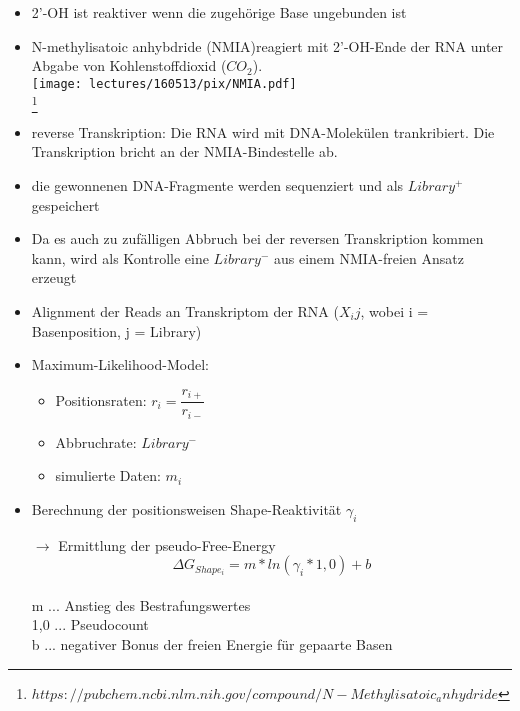 \begin{itemize}
\item 2'-OH ist reaktiver wenn die zugehörige Base ungebunden ist
\item N-methylisatoic anhybdride (NMIA)reagiert mit 2'-OH-Ende der RNA unter Abgabe von Kohlenstoffdioxid ($CO_2$). \\
\texttt{[image: lectures/160513/pix/NMIA.pdf]} \\
\footnote{$https://pubchem.ncbi.nlm.nih.gov/compound/N-Methylisatoic_anhydride$} \\

\item reverse Transkription: Die RNA wird mit DNA-Molekülen trankribiert. Die Transkription bricht an der NMIA-Bindestelle ab.
\item die gewonnenen DNA-Fragmente werden sequenziert und als $Library^+$ gespeichert
\item Da es auch zu zufälligen Abbruch bei der reversen Transkription kommen kann, wird als Kontrolle eine $Library^-$ aus einem NMIA-freien Ansatz erzeugt
\item Alignment der Reads an Transkriptom der RNA ($X_ij$, wobei i = Basenposition, j = Library)

\item Maximum-Likelihood-Model:

\begin{itemize}
\item Positionsraten: $r_i = \dfrac{r_{i+}}{r_{i-}}$
\item Abbruchrate: $Library^-$
\item simulierte Daten: $m_i$ 
\end{itemize}

\item Berechnung der positionsweisen Shape-Reaktivität $\gamma_i$

\item[$\rightarrow$] Ermittlung der pseudo-Free-Energy \\
\begin{equation}
\Delta G_{Shape_i} = m * ln(\gamma_i * 1,0) + b
\end{equation} \\

m ... Anstieg des Bestrafungswertes \\
1,0 ... Pseudocount \\
b ... negativer Bonus der freien Energie für gepaarte Basen \\


\end{itemize}

